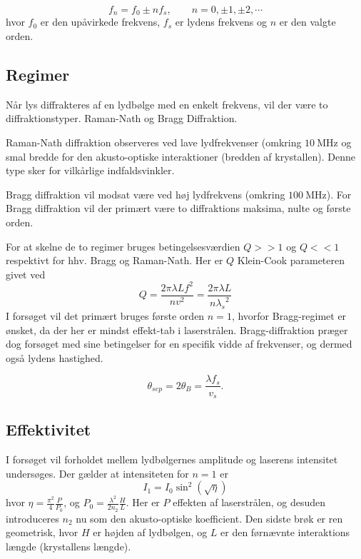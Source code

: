 \documentclass[main]{subfiles}
\begin{document}
\begin{equation}
    f_n = f_0 \pm nf_s, \qquad n=0, \pm1, \pm2, \cdots
    \label{eq:frequence}
\end{equation}
hvor $f_0$ er den upåvirkede frekvens, $f_s$ er lydens frekvens og $n$ er den valgte orden. 

\subsection{Regimer}
Når lys diffrakteres af en lydbølge med en enkelt frekvens, vil der være to diffraktionstyper. Raman-Nath og Bragg Diffraktion.

Raman-Nath diffraktion observeres ved lave lydfrekvenser (omkring $\SI{10}{\mega\hertz}$ og smal bredde for den akusto-optiske interaktioner (bredden af krystallen). Denne type sker for vilkårlige indfaldsvinkler.

    Bragg diffraktion vil modsat være ved høj lydfrekvens (omkring $\SI{100}{\mega\hertz}$). For Bragg diffraktion vil der primært være to diffraktions maksima, nulte og første orden.

    For at skelne de to regimer bruges betingelsesværdien $Q>>1$ og $Q<<1$ respektivt for hhv. Bragg og Raman-Nath. Her er $Q$ Klein-Cook parameteren givet ved
    \begin{equation}
    Q = \frac{2\pi\lambda L f^2}{nv^2}=\frac{2\pi\lambda L}{n{\lambda_s}^2}
        \label{eq:KleinCook}
    \end{equation}
I forsøget vil det primært bruges første orden $n=1$, hvorfor Bragg-regimet er ønsket, da der her er mindst effekt-tab i laserstrålen. Bragg-diffraktion præger dog forsøget med sine betingelser for en specifik vidde af frekvenser, og dermed også lydens hastighed.

\begin{equation}
    \theta_{sep} = 2 \theta_B = \frac{\lambda f_s}{v_s}.
    \label{eq:sep}
\end{equation}


\subsection{Effektivitet}
I forsøget vil forholdet mellem lydbølgernes amplitude og laserens intensitet undersøges. Der gælder at intensiteten for $n=1$ er
\begin{equation}
    I_1 = I_0 \sin^2\left( \sqrt{\eta} \right)
    \label{eq:Intensitet}
\end{equation}
hvor $\eta = \frac{\pi^2}{4}\frac{P}{P_0}$, og $P_0 = \frac{\lambda^2}{2 n_2}\frac{H}{L}$. Her er $P$ effekten af laserstrålen, og desuden introduceres $n_2$ nu som den akusto-optiske koefficient. Den sidste brøk er ren geometrisk, hvor $H$ er højden af lydbølgen, og $L$ er den førnævnte interaktions længde (krystallens længde). 
\end{document}
